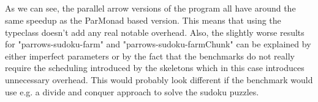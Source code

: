 \\\\
\\\\
As we can see, the parallel arrow versions of the program all have around the same speedup as the ParMonad based version. This means that using the  typeclass doesn't add any real notable overhead. Also, the slightly worse results for "parrows-sudoku-farm" and "parrows-sudoku-farmChunk" can be explained by either imperfect parameters or by the fact that the benchmarks do not really require the scheduling introduced by the skeletons which in this case introduces unnecessary overhead. This would probably look different if the benchmark would use e.g. a divide and conquer approach to solve the sudoku puzzles.


